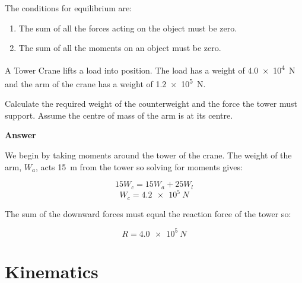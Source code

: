 \documentclass[main.tex]{subfiles}
\begin{document}
The conditions for equilibrium are:
\begin{enumerate}
	\item The sum of all the forces acting on the object must be zero.
	\item The sum of all the moments on an object must be zero.
\end{enumerate}
\begin{example}
	A Tower Crane lifts a load into position. The load has a weight of \SI{4.0e4}{N} and the arm of the crane has a weight of \SI{1.2e5}{N}.

	Calculate the required weight of the counterweight and the force the tower must support. Assume the centre of mass of the arm is at its centre.

	\vspace{1cm}

		\begin{center}
		\end{center}

		\textbf{Answer}

		We begin by taking moments around the tower of the crane. The weight of the arm, $W_a$, acts \SI{15}{m} from the tower so solving for moments gives:

		$$ 15W_c = 15W_a + 25W_l $$
		$$ W_c = \SI{4.2e5}{N} $$

		The sum of the downward forces must equal the reaction force of the tower so:

		$$ R = \SI{4.0e5}{N} $$
\end{example}

\section{Kinematics}
\end{document}
